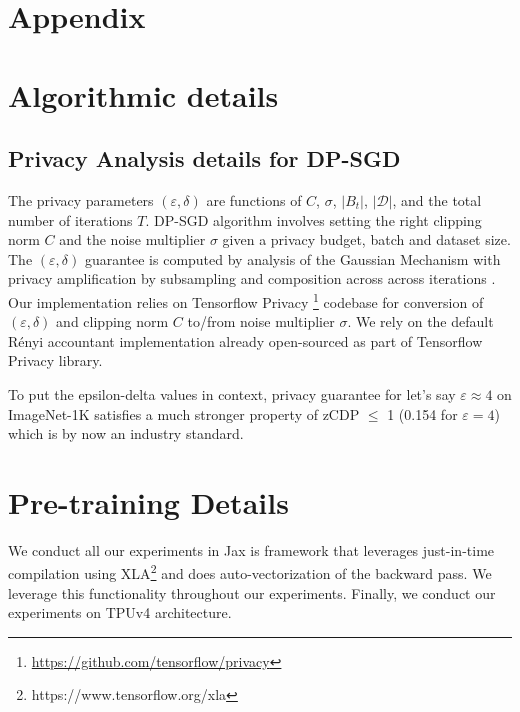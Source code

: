 \documentclass[letterpaper]{article} \usepackage{fullpage}
\def\cD{\mathcal{D}}
\renewcommand{\epsilon}{\varepsilon}
\begin{document}



\appendix
\section{Appendix}
\section{Algorithmic details}



\subsection{Privacy Analysis details for DP-SGD}
The privacy parameters $(\epsilon, \delta)$ are functions of $C$, $\sigma$, $|B_t|$, $|\cD|$, and the total number of iterations $T$. DP-SGD algorithm involves setting the right clipping norm $C$ and the noise multiplier $\sigma$ given a privacy budget, batch and dataset size. The $(\epsilon, \delta)$ guarantee is computed by analysis of the Gaussian Mechanism with privacy amplification by subsampling and composition across across iterations \citep{KLNRS,Bassily_2014,abadi2016dpsgd,mironov2017renyi,mcmahan2017learning, mironov2019rnyi,Erlingsson_amplification_2019,zhu2019poission,feldman2020hiding,wang_subsampled_2020}.  Our implementation relies on Tensorflow Privacy \footnote{\url{https://github.com/tensorflow/privacy}} codebase for conversion of $(\epsilon, \delta)$ and clipping norm $C$ to/from noise multiplier $\sigma$.  We rely on the default R\'enyi accountant implementation already open-sourced as part of Tensorflow Privacy library.

To put the epsilon-delta values in context, privacy guarantee for let's say $\epsilon \approx 4$ on ImageNet-1K satisfies a much stronger property of zCDP $\leq$ 1 (0.154 for $\epsilon=4$) which is by now an industry standard.

\section{Pre-training Details}
We conduct all our experiments in Jax \citep{jax2018github,XLA} is framework that leverages just-in-time compilation using XLA\footnote{https://www.tensorflow.org/xla} and does auto-vectorization of the backward pass. We leverage this functionality throughout our experiments. Finally, we conduct our experiments on TPUv4 architecture.
\end{document}
